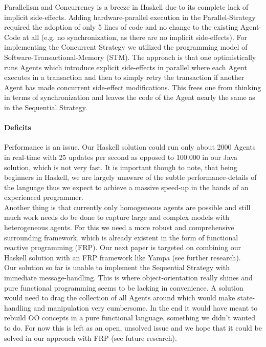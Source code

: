 Parallelism and Concurrency is a breeze in Haskell due to its complete lack of implicit side-effects. Adding hardware-parallel execution in the Parallel-Strategy required the adoption of only 5 lines of code and no change to the existing Agent-Code at all (e.g. no synchronization, as there are no implicit side-effects). For implementing the Concurrent Strategy we utilized the programming model of Software-Transactional-Memory (STM). The approach is that one optimistically runs Agents which introduce explicit side-effects in parallel where each Agent executes in a transaction and then to simply retry the transaction if another Agent has made concurrent side-effect modifications. This frees one from thinking in terms of synchronization and leaves the code of the Agent nearly the same as in the Sequential Strategy.

\paragraph{Deficits}
Performance is an issue. Our Haskell solution could run only about 2000 Agents in real-time with 25 updates per second as opposed to 100.000 in our Java solution, which is not very fast. It is important though to note, that being beginners in Haskell, we are largely unaware of the subtle performance-details of the language thus we expect to achieve a massive speed-up in the hands of an experienced programmer. \\

Another thing is that currently only homogeneous agents are possible and still much work needs do be done to capture large and complex models with heterogeneous agents. For this we need a more robust and comprehensive surrounding framework, which is already existent in the form of functional reactive programming (FRP). Our next paper is targeted on combining our Haskell solution with an FRP framework like Yampa (see further research). \\ 

Our solution so far is unable to implement the Sequential Strategy with immediate message-handling. This is where object-orientation really shines and pure functional programming seems to be lacking in convenience. A solution would need to drag the collection of all Agents around which would make state-handling and manipulation very cumbersome. In the end it would have meant to rebuild OO concepts in a pure functional language, something we didn't wanted to do. For now this is left as an open, unsolved issue and we hope that it could be solved in our approach with FRP (see future research).

